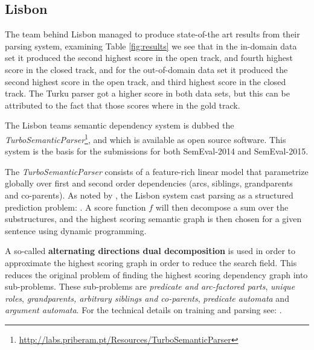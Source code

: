 \subsection{Lisbon} 

The team behind Lisbon managed to produce state-of-the art results from their parsing system, examining Table \ref{fig:results} we see that in the in-domain data set it produced the second highest score in the open track, and fourth highest score in the closed track, and for the out-of-domain data set it produced the second highest score in the open track, and third highest score in the closed track. The Turku parser got a higher score in both data sets, but this can be attributed to the fact that those scores where in the gold track.

The Lisbon teams semantic dependency system is dubbed the \textit{TurboSemanticParser}\footnote{\url{http://labs.priberam.pt/Resources/TurboSemanticParser}}, and which is available as open source software. This system is the basis for the submissions for both SemEval-2014 and SemEval-2015. 

The \textit{TurboSemanticParser} consists of a feature-rich linear model that parametrize globally over first and second order dependencies (arcs, siblings, grandparents and co-parents). As noted by , the Lisbon system cast parsing as a structured prediction problem: . A score function $f$ will then decompose a sum over the substructures, and the highest scoring semantic graph is then chosen for a given sentence using dynamic programming.

A so-called \textbf{alternating directions dual decomposition} is used in order to approximate the highest scoring graph in order to reduce the search field. This reduces the original problem of finding the highest scoring dependency graph into sub-problems. These sub-problems are \textit{predicate and arc-factored parts}, \textit{unique roles}, \textit{grandparents, arbitrary siblings and co-parents}, \textit{predicate automata} and \textit{argument automata}. For the technical details on training and parsing see: .


